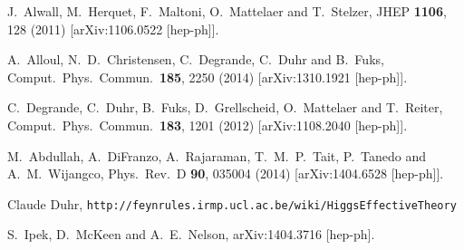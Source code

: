 \documentclass[showpacs,preprintnumbers,amsmath,amssymb]{revtex4}
\begin{document}
\begin{thebibliography}{90}

  J.~Alwall, M.~Herquet, F.~Maltoni, O.~Mattelaer and T.~Stelzer,
  JHEP {\bf 1106}, 128 (2011)
  [arXiv:1106.0522 [hep-ph]].

  A.~Alloul, N.~D.~Christensen, C.~Degrande, C.~Duhr and B.~Fuks,
  Comput.\ Phys.\ Commun.\  {\bf 185}, 2250 (2014)
  [arXiv:1310.1921 [hep-ph]].

  C.~Degrande, C.~Duhr, B.~Fuks, D.~Grellscheid, O.~Mattelaer and T.~Reiter,
  Comput.\ Phys.\ Commun.\  {\bf 183}, 1201 (2012)
  [arXiv:1108.2040 [hep-ph]].

  M.~Abdullah, A.~DiFranzo, A.~Rajaraman, T.~M.~P.~Tait, P.~Tanedo and A.~M.~Wijangco,
  Phys.\ Rev.\ D {\bf 90}, 035004 (2014)
  [arXiv:1404.6528 [hep-ph]].

  Claude Duhr,
  \texttt{http://feynrules.irmp.ucl.ac.be/wiki/HiggsEffectiveTheory}

  S.~Ipek, D.~McKeen and A.~E.~Nelson,
  arXiv:1404.3716 [hep-ph].





\end{thebibliography}
\end{document}
